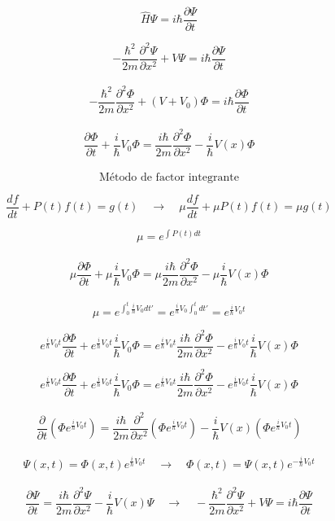 \documentclass[10pt,a4papper]{article}
\begin{document}
\[\hat H\Psi=i\hbar\frac{\partial\Psi}{\partial t}\]

\[-\frac{\hbar^2}{2m}\frac{\partial^2\Psi}{\partial x^2}+V\Psi=i\hbar\frac{\partial\Psi}{\partial t}\]\\

\[-\frac{\hbar^2}{2m}\frac{\partial^2\Phi}{\partial x^2}+(V+V_0)\Phi=i\hbar\frac{\partial\Phi}{\partial t}\]\\

\[\frac{\partial\Phi}{\partial t}+\frac{i}{\hbar}V_0\Phi=\frac{i\hbar}{2m}\frac{\partial^2\Phi}{\partial x^2}-\frac{i}{\hbar}V(x)\Phi\]\\

\[\text{Método de factor integrante}\]

\[\frac{df}{dt}+P(t)f(t)=g(t)\quad\to\quad\mu\frac{df}{dt}+\mu P(t)f(t)=\mu g(t)\]

\[\mu=e^{\int P(t)dt}\]\\

\[\mu\frac{\partial\Phi}{\partial t}+\mu\frac{i}{\hbar}V_0\Phi=\mu\frac{i\hbar}{2m}\frac{\partial^2\Phi}{\partial x^2}-\mu\frac{i}{\hbar}V(x)\Phi\]\\

\[\mu=e^{\int_0^t\frac{i}{\hbar}V_0dt'}=e^{\frac{i}{\hbar}V_0\int_0^tdt'}=e^{\frac{i}{\hbar}V_0t}\]

\[e^{\frac{i}{\hbar}V_0t}\frac{\partial\Phi}{\partial t}+e^{\frac{i}{\hbar}V_0t}\frac{i}{\hbar}V_0\Phi=
e^{\frac{i}{\hbar}V_0t}\frac{i\hbar}{2m}\frac{\partial^2\Phi}{\partial x^2}-e^{\frac{i}{\hbar}V_0t}\frac{i}{\hbar}V(x)\Phi\]

\newpage
\[e^{\frac{i}{\hbar}V_0t}\frac{\partial\Phi}{\partial t}+e^{\frac{i}{\hbar}V_0t}\frac{i}{\hbar}V_0\Phi=
e^{\frac{i}{\hbar}V_0t}\frac{i\hbar}{2m}\frac{\partial^2\Phi}{\partial x^2}-e^{\frac{i}{\hbar}V_0t}\frac{i}{\hbar}V(x)\Phi\]\\

\[\frac{\partial}{\partial t}\left(\Phi e^{\frac{i}{\hbar}V_0t}\right)=
\frac{i\hbar}{2m}\frac{\partial^2}{\partial x^2}\left(\Phi e^{\frac{i}{\hbar}V_0t}\right)-\frac{i}{\hbar}V(x)\left(\Phi e^{\frac{i}{\hbar}V_0t}\right)\]\\

\[\boxed{\Psi(x,t)=\Phi(x,t)e^{\frac{i}{\hbar}V_0t}\quad\to\quad
\Phi(x,t)=\Psi(x,t)e^{-\frac{i}{\hbar}V_0t}}\]\\

\[\frac{\partial\Psi}{\partial t}=\frac{i\hbar}{2m}\frac{\partial^2\Psi}{\partial x^2}-\frac{i}{\hbar}V(x)\Psi\quad\to\quad
-\frac{\hbar^2}{2m}\frac{\partial^2\Psi}{\partial x^2}+V\Psi=i\hbar\frac{\partial\Psi}{\partial t}\]\\
\end{document}
